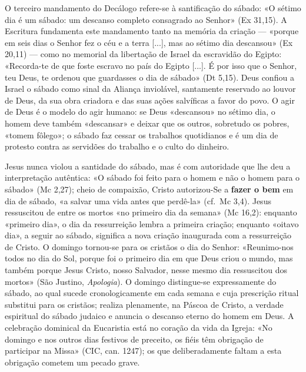 O terceiro mandamento do Decálogo refere-se à santificação do sábado: «O sétimo dia é um sábado: um descanso completo consagrado ao Senhor» (Ex 31,15). A Escritura fundamenta este mandamento tanto na memória da criação --- «porque em seis dias o Senhor fez o céu e a terra [...], mas ao sétimo dia descansou» (Ex 20,11) --- como no memorial da libertação de Israel da escravidão do Egipto: «Recorda-te de que foste escravo no país do Egipto [...]. É por isso que o Senhor, teu Deus, te ordenou que guardasses o dia de sábado» (Dt 5,15). Deus confiou a Israel o sábado como sinal da Aliança inviolável, santamente reservado ao louvor de Deus, da sua obra criadora e das suas ações salvíficas a favor do povo. O agir de Deus é o modelo do agir humano: se Deus «descansou» no sétimo dia, o homem deve também «descansar» e deixar que os outros, sobretudo os pobres, «tomem fôlego»; o sábado faz cessar os trabalhos quotidianos e é um dia de protesto contra as servidões do trabalho e o culto do dinheiro.

Jesus nunca violou a santidade do sábado, mas é com autoridade que lhe deu a interpretação autêntica: «O sábado foi feito para o homem e não o homem para o sábado» (Mc 2,27); cheio de compaixão, Cristo autorizou-Se a \textbf{fazer o bem} em dia de sábado, «a salvar uma vida antes que perdê-la» (cf.~Mc 3,4). Jesus ressuscitou de entre os mortos «no primeiro dia da semana» (Mc 16,2): enquanto «primeiro dia», o dia da ressurreição lembra a primeira criação; enquanto «oitavo dia», a seguir ao sábado, significa a nova criação inaugurada com a ressurreição de Cristo. O domingo tornou-se para os cristãos o dia do Senhor: «Reunimo-nos todos no dia do Sol, porque foi o primeiro dia em que Deus criou o mundo, mas também porque Jesus Cristo, nosso Salvador, nesse mesmo dia ressuscitou dos mortos» (São Justino, \textit{Apologia}). O domingo distingue-se expressamente do sábado, ao qual sucede cronologicamente em cada semana e cuja prescrição ritual substitui para os cristãos; realiza plenamente, na Páscoa de Cristo, a verdade espiritual do sábado judaico e anuncia o descanso eterno do homem em Deus. A celebração dominical da Eucaristia está no coração da vida da Igreja: «No domingo e nos outros dias festivos de preceito, os fiéis têm obrigação de participar na Missa» (CIC, can. 1247); os que deliberadamente faltam a esta obrigação cometem um pecado grave.

